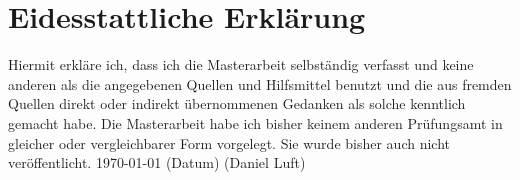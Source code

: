 \documentclass[bibliography=totoc,12pt,a4paper]{scrartcl}
\theoremstyle{exampstyle}
\numberwithin{equation}{section}
\begin{document}
\newpage
\appendix
\section{Eidesstattliche Erklärung}
Hiermit erkläre ich, dass ich die Masterarbeit selbständig verfasst und keine anderen als die angegebenen Quellen und Hilfsmittel benutzt und die aus fremden Quellen direkt oder indirekt übernommenen
Gedanken als solche kenntlich gemacht habe. Die Masterarbeit habe ich bisher keinem anderen Prüfungsamt in gleicher oder vergleichbarer Form vorgelegt. Sie wurde bisher auch nicht veröffentlicht.
\vspace{1.5cm}
\today \newline
(Datum) \hspace{9cm} (Daniel Luft)


\newpage
\nocite{*}


\end{document}
